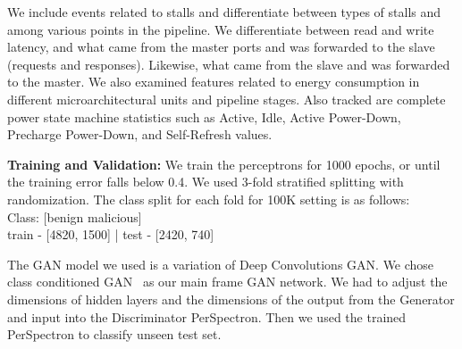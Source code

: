 We include events related to stalls and differentiate between types of stalls and 
among various points in the pipeline. We differentiate between read and write 
latency, and what came from the master ports and was forwarded to the slave 
(requests and responses). Likewise, what came from the slave and was forwarded 
to the master. We also examined features related to energy consumption in different 
microarchitectural units and pipeline stages. Also tracked are complete power state 
machine statistics such as Active, Idle, Active Power-Down, Precharge Power-Down, 
and Self-Refresh values. 

\noindent \textbf{Training and Validation:} We train the perceptrons for 1000 epochs, or 
until the training error falls below 0.4.  
We used 3-fold stratified splitting with randomization. The class split for each fold for 100K setting is as follows:  \\
Class: [benign malicious]\\
train - [4820, 1500]  | test - [2420, 740]



The GAN model we used is a variation of Deep Convolutions GAN. We chose class conditioned GAN~\cite{} as our main frame GAN network. We had to adjust the dimensions of hidden layers and the dimensions of the output from the Generator and input into the Discriminator PerSpectron. Then we used the trained PerSpectron to classify unseen test set.  
  



